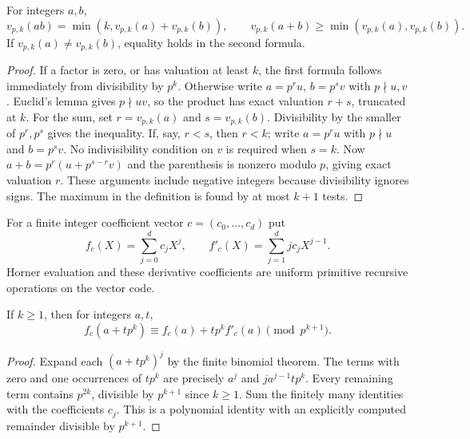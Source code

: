 \begin{theorem}\label{ag:valuation}
For integers $a,b$,
\[
 v_{p,k}(ab)=\min(k,v_{p,k}(a)+v_{p,k}(b)),\qquad
 v_{p,k}(a+b)\ge\min(v_{p,k}(a),v_{p,k}(b)).
\]
If $v_{p,k}(a)\ne v_{p,k}(b)$, equality holds in the second formula.
\end{theorem}
\begin{proof}
If a factor is zero, or has valuation at least $k$, the first formula follows immediately from divisibility by $p^k$. Otherwise write $a=p^ru$, $b=p^sv$ with $p\nmid u,v$. Euclid's lemma gives $p\nmid uv$, so the product has exact valuation $r+s$, truncated at $k$. For the sum, set $r=v_{p,k}(a)$ and $s=v_{p,k}(b)$. Divisibility by the smaller of $p^r,p^s$ gives the inequality. If, say, $r<s$, then $r<k$; write $a=p^ru$ with $p\nmid u$ and $b=p^sv$. No indivisibility condition on $v$ is required when $s=k$. Now $a+b=p^r(u+p^{s-r}v)$ and the parenthesis is nonzero modulo $p$, giving exact valuation $r$. These arguments include negative integers because divisibility ignores signs. The maximum in the definition is found by at most $k+1$ tests.
\end{proof}

For a finite integer coefficient vector $c=(c_0,\ldots,c_d)$ put
\[
 f_c(X)=\sum_{j=0}^d c_jX^j,\qquad
 f'_c(X)=\sum_{j=1}^d j c_jX^{j-1}.
\]
Horner evaluation and these derivative coefficients are uniform primitive recursive operations on the vector code.

\begin{lemma}\label{ag:taylor}
If $k\ge1$, then for integers $a,t$,
\[
 f_c(a+t p^k)\equiv f_c(a)+t p^k f'_c(a)\pmod{p^{k+1}}.
\]
\end{lemma}
\begin{proof}
Expand each $(a+tp^k)^j$ by the finite binomial theorem. The terms with zero and one occurrences of $tp^k$ are precisely $a^j$ and $j a^{j-1}tp^k$. Every remaining term contains $p^{2k}$, divisible by $p^{k+1}$ since $k\ge1$. Sum the finitely many identities with the coefficients $c_j$. This is a polynomial identity with an explicitly computed remainder divisible by $p^{k+1}$.
\end{proof}

